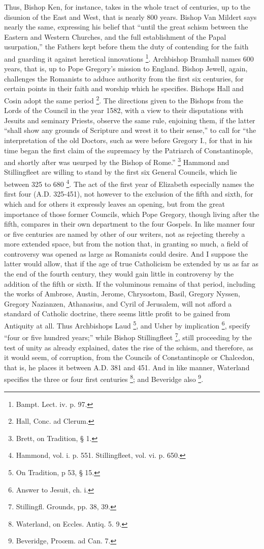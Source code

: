 Thus, Bishop Ken, for instance, takes in the whole tract of
centuries, up to the disunion of the East and West, that is nearly 800
years. Bishop Van Mildert says nearly the same, expressing his belief
that ``until the great schism between the Eastern and Western
Churches, and the full establishment of the Papal usurpation,''
the Fathers kept before them the duty of contending for the faith and
guarding it against heretical innovations \footnote{Bampt. Lect. iv. p. 97.}. Archbishop Bramhall names 600 years, that is, up to Pope
Gregory's mission to England. Bishop Jewell, again, challenges the
Romanists to adduce authority from the first six centuries, for
certain points in their faith and worship which he specifies. Bishops
Hall and Cosin adopt the same period \footnote{Hall, Conc. ad Clerum.}. The directions given to the Bishops from the Lords of the
Council in the year 1582, with a view to their disputations with
Jesuits and seminary Priests, observe the same rule, enjoining them,
if the latter ``shall show any grounds of Scripture and wrest it
to their sense,'' to call for ``the interpretation of the old
Doctors, such as were before Gregory I., for that in his time began
the first claim of the supremacy by the Patriarch of Constantinople,
and shortly after was usurped by the Bishop of Rome.'' \footnote{Brett, on Tradition, § 1.} Hammond and Stillingfleet are willing to stand by the first
six General Councils, which lie between 325 to 680 \footnote{Hammond, vol. i. p. 551. Stillingfleet,
vol. vi. p. 650.}. The act of the first year of Elizabeth especially names the
first four (A.D. 325-451), not however to the exclusion of the fifth
and sixth, for which and for others it expressly leaves an opening,
but from the great importance of those former Councils, which Pope
Gregory, though living after the fifth, compares in their own
department to the four Gospels. In like manner four or five centuries
are named by other of our writers, not as rejecting thereby a more
extended space, but from the notion that, in granting so much, a field
of controversy was opened as large as Romanists could desire. And I
suppose the latter would allow, that if the age of true Catholicism be
extended by us as far as the end of the fourth century, they would
gain little in controversy by the addition of the fifth or sixth. If
the voluminous remains of that period, including the works of Ambrose,
Austin, Jerome, Chrysostom, Basil, Gregory Nyssen, Gregory Nazianzen,
Athanasius, and Cyril of Jerusalem, will not afford a standard of
Catholic doctrine, there seems little profit to be gained from
Antiquity at all. Thus Archbishops Laud \footnote{On Tradition, p 53, § 15.}, and Usher by implication \footnote{Answer to Jesuit, ch. i.}, specify ``four or five hundred years;'' while Bishop
Stillingfleet \footnote{Stillingfl. Grounds, pp. 38, 39.}, still
proceeding by the test of unity as already explained, dates the rise
of the schism, and therefore, as it would seem, of corruption, from
the Councils of Constantinople or Chalcedon, that is, he places it
between A.D. 381 and 451. And in like manner, Waterland specifies the
three or four first centuries \footnote{Waterland, on Eccles. Antiq. 5. 9.}; and Beveridge also \footnote{Beveridge, Proœm. ad Can. 7.}.

